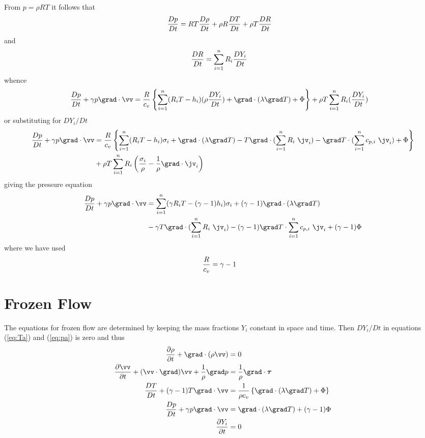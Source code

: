 \documentclass{article}
\begin{document}
From $p=\rho R T$ it follows that
\begin{align}
    {D p\over Dt} &=  RT {D \rho\over Dt} + \rho R  {D T\over Dt} + \rho T  {D R\over Dt}
\end{align}
and
\begin{align}
   {D R\over Dt} &=  \sum_{i=1}^n R_i {D Y_i \over Dt}
\end{align}
whence
\begin{align}
    {D p\over Dt} + \gamma p \grad\cdot\vv &= 
       {R\over c_v}  \left\{ \sumi  (R_i T-h_i) (\rho{D Y_i \over Dt}) + \grad\cdot(\lambda\grad T)
              + \Phi \right\}   + \rho T \sumi R_i ({D Y_i \over Dt}) \label{eq:pa}
\end{align}
or substituting for $DY_i/Dt$ 
\begin{align}
    {D p\over Dt} + \gamma p \grad\cdot\vv &= 
       {R\over c_v}  \left\{ \sumi  (R_i T-h_i) \sigma_i + \grad\cdot(\lambda\grad T)
      - T \grad\cdot( \sumi  R_i ~\jv_i) - \grad T \cdot ( \sumi c_{p,i} ~\jv_i )
              + \Phi \right\} \\
      & + \rho T \sumi R_i \left( {\sigma_i \over \rho} - {1\over\rho}\grad\cdot\jv_i  \right)
\end{align}
giving the pressure equation 
\begin{align}
    {D p\over Dt} + \gamma p \grad\cdot\vv &= 
        \sumi  ({\gamma R_i} T- (\gamma-1)h_i) \sigma_i + (\gamma-1) \grad\cdot(\lambda\grad T) \\
    &  - \gamma T \grad\cdot( \sumi R_i~\jv_i) - (\gamma-1)\grad T \cdot \sumi c_{p,i}~\jv_i
              + (\gamma-1) \Phi 
\end{align}
where we have used
\begin{align}
   {R\over c_v} &= \gamma -1
\end{align}


\section{Frozen Flow}
 The equations for frozen flow are determined by keeping the mass fractions $Y_i$ constant in space and
time. Then $DY_i/Dt$ in equations (\ref{eq:Ta}) and (\ref{eq:pa}) is zero and thus
\begin{align*}
   {\partial \rho  \over \partial t} + \grad\cdot(\rho \vv)&=0 \\
   {\partial \vv  \over \partial t}  + (\vv\cdot\grad)\vv +{1\over\rho} \grad p &= {1\over\rho}\grad\cdot\tauv \\
  {D T\over Dt} + (\gamma-1) T \grad\cdot\vv & = 
       {1\over \rho c_v}  \left\{ \grad\cdot(\lambda\grad T) + \Phi \right\} \\
    {D p\over Dt} + \gamma p \grad\cdot\vv &=  \grad\cdot(\lambda\grad T) + (\gamma-1) \Phi  \\
   {\partial Y_i  \over \partial t} & = 0 
\end{align*}
\end{document}
